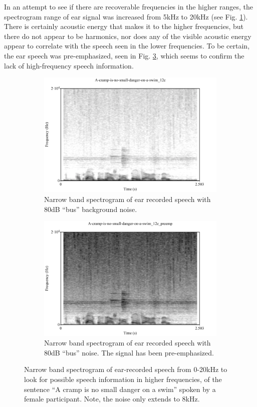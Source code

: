 \documentclass[dissertation,copyright]{uathesis}
\begin{document}
In an attempt to see if there are recoverable frequencies in the higher ranges, the spectrogram range of ear signal was increased from 5kHz to 20kHz (see Fig. \ref{spctgrmEarNarrow20kHz}). There is certainly acoustic energy that makes it to the higher frequencies, but there do not appear to be harmonics, nor does any of the visible acoustic energy appear to correlate with the speech seen in the lower frequencies.
To be certain, the ear speech was pre-emphasized, seen in Fig. \ref{spctgrmNarrowEarNoisePremp_35}, which seems to confirm the lack of high-frequency speech information. 
\begin{figure}
\centering
\begin{subfigure}{0.475\textwidth}
  \centering
  \includegraphics[width=1\linewidth]{figure/spctgrmEarNarrow20kHz.pdf}
  \caption{Narrow band spectrogram of ear recorded speech with 80dB ``bus'' background noise.}
  \label{spctgrmEarNarrow20kHz}
\end{subfigure}%
\hfill
\begin{subfigure}{0.475\textwidth}
  \centering
  \includegraphics[width=1\linewidth]{figure/spctgrmNarrowEarNoisePremp.pdf}
  \caption{Narrow band spectrogram of ear recorded speech with 80dB ``bus'' noise.  The signal has been pre-emphasized.}
  \label{spctgrmNarrowEarNoisePremp_35}
\end{subfigure}
\caption{Narrow band spectrogram of ear-recorded speech from 0-20kHz to look for possible speech information in higher frequencies, of the sentence ``A cramp is no small danger on a swim'' spoken by a female participant. Note, the noise only extends to 8kHz.}
\end{figure}
\end{document}
